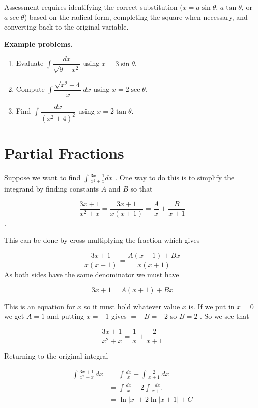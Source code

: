 Assessment requires identifying the correct substitution ($x = a\sin\theta$, $a\tan\theta$, or $a\sec\theta$) based on the radical form, completing the square when necessary, and converting back to the original variable.

\textbf{Example problems.}

\begin{enumerate}
    \item Evaluate $\int\dfrac{dx}{\sqrt{9-x^2}}$ using $x = 3\sin\theta$.
    \item Compute $\int\dfrac{\sqrt{x^2-4}}{x}\,dx$ using $x = 2\sec\theta$.
    \item Find $\int\dfrac{dx}{(x^2+4)^2}$ using $x = 2\tan\theta$.
\end{enumerate}

\section{Partial Fractions}
\label{sec:partial-fractions}

Suppose we want to find $\int\frac{3x+1}{x^2+x}dx$ . One way to do this is to simplify the integrand by finding constants $A$ and $B$ so that


\[
\frac{3x+1}{x^2+x}=\frac{3x+1}{x(x+1)}=\frac{A}{x}+\frac{B}{x+1}
\] .

This can be done by cross multiplying the fraction which gives


\[
\frac{3x+1}{x(x+1)}=\frac{A(x+1)+Bx}{x(x+1)}
\] As both sides have the same denominator we must have


\[
3x+1=A(x+1)+Bx
\]

This is an equation for $x$ so it must hold whatever value $x$ is. If we put in $x=0$ we get $A=1$ and putting $x=-1$ gives $=-B=-2$ so $B=2$ . So we see that


\[
\frac{3x+1}{x^2+x}=\frac{1}{x}+\frac{2}{x+1}
\]


Returning to the original integral


\begin{align}
\int\frac{3x+1}{x^2+x}\,dx &= \int\frac{dx}{x} + \int\frac{2}{x+1}\,dx \\&= \int\frac{dx}{x} + 2\int\frac{dx}{x+1} \\&= \ln|x| + 2\ln\Big|x+1\Big| + C
\end{align}


